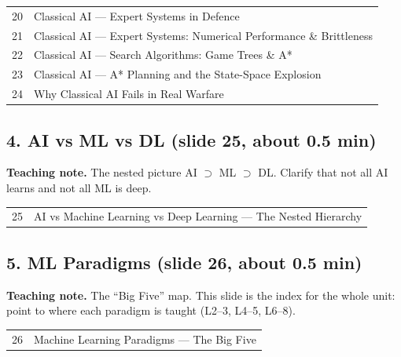 \documentclass[11pt]{article}
\begin{document}
\begin{center}\small\renewcommand{\arraystretch}{1.1}\begin{tabularx}{\textwidth}{@{}r X@{}}20 & Classical AI --- Expert Systems in Defence\\
21 & Classical AI --- Expert Systems: Numerical Performance \& Brittleness\\
22 & Classical AI --- Search Algorithms: Game Trees \& A*\\
23 & Classical AI --- A* Planning and the State-Space Explosion\\
24 & Why Classical AI Fails in Real Warfare\\\end{tabularx}\end{center}

\subsection{4. AI vs ML vs DL \normalfont\small\color{GreyN}(slide 25, about 0.5 min)}

\textbf{Teaching note.} The nested picture AI $\supset$ ML $\supset$ DL. Clarify that not all AI learns and not all ML is deep.

\begin{center}\small\renewcommand{\arraystretch}{1.1}\begin{tabularx}{\textwidth}{@{}r X@{}}25 & AI vs Machine Learning vs Deep Learning --- The Nested Hierarchy\\\end{tabularx}\end{center}

\subsection{5. ML Paradigms \normalfont\small\color{GreyN}(slide 26, about 0.5 min)}

\textbf{Teaching note.} The ``Big Five'' map. This slide is the index for the whole unit: point to where each paradigm is taught (L2--3, L4--5, L6--8).

\begin{center}\small\renewcommand{\arraystretch}{1.1}\begin{tabularx}{\textwidth}{@{}r X@{}}26 & Machine Learning Paradigms --- The Big Five\\\end{tabularx}\end{center}
\end{document}
